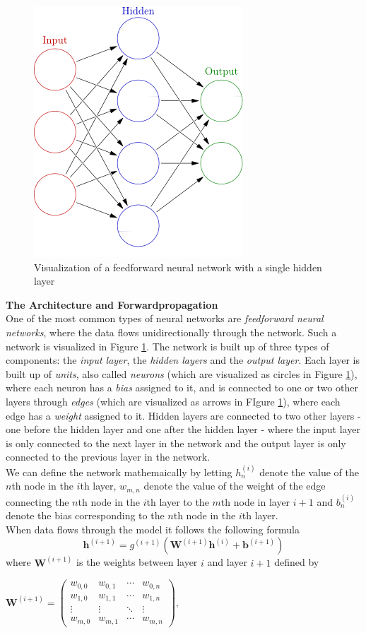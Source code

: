 \documentclass[main.tex]{subfiles}
\begin{document}
\begin{figure}[H]
    \centering
    \includegraphics[height = 5 cm]{entities/feed_forward_nn.jpg}
    \caption{Visualization of a feedforward neural network with a single hidden layer \cite{feedforward_nn}}
    \label{feedforward_nn}
\end{figure}
\noindent \textbf{The Architecture and Forwardpropagation} \\
One of the most common types of neural networks are \textit{feedforward neural networks}, where the data flows unidirectionally through the network. Such a network is visualized in Figure \ref{feedforward_nn}. The network is built up of three types of components: the \textit{input layer}, the \textit{hidden layers} and the \textit{output layer}. Each layer is built up of \textit{units}, also called \textit{neurons} (which are visualized as circles in Figure \ref{feedforward_nn}), where each neuron has a \textit{bias} assigned to it, and is connected to one or two other layers through \textit{edges} (which are visualized as arrows in FIgure \ref{feedforward_nn}), where each edge has a \textit{weight} assigned to it. Hidden layers are connected to two other layers - one before the hidden layer and one after the hidden layer - where the input layer is only connected to the next layer in the network and the output layer is only connected to the previous layer in the network. \\
We can define the network mathemaically by letting $h_n ^{(i)}$ denote the value of the $n$th node in the $i$th layer, $w_{m, n}$ denote the value of the weight of the edge connecting the $n$th node in the $i$th layer to the $m$th node in layer $i + 1$ and $b_n ^{(i)}$ denote the bias corresponding to the $n$th node in the $i$th layer. \\
When data flows through the model it follows the following formula
$$\bm{h}^{(i + 1)} = g^{(i + 1)} \left( \bm{W}^{(i + 1)} \bm{h}^{(i)} + \bm{b}^{(i + 1)} \right)$$
where $\bm{W}^{(i + 1)}$ is the weights between layer $i$ and layer $i + 1$ defined by
\begin{center}
    \begin{math}
        \bm{W}^{(i + 1)} =
        \begin{pmatrix}
            w_{0, 0} & w_{0, 1} & \cdots & w_{0, n} \\
            w_{1, 0} & w_{1, 1} & \cdots & w_{1, n} \\
            \vdots & \vdots & \ddots & \vdots \\
            w_{m, 0} & w_{m, 1} & \cdots & w_{m, n}
        \end{pmatrix}
        ,
    \end{math}
\end{center}
\end{document}
